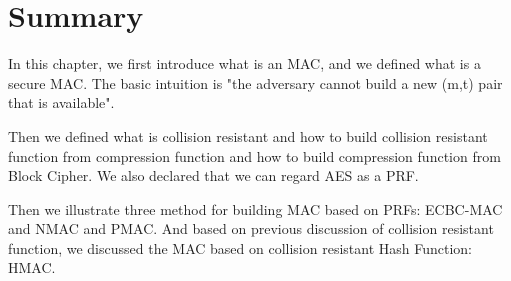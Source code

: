 \section{Summary}
In this chapter, we first introduce what is an MAC, and we defined what is a secure MAC. The basic intuition is "the adversary cannot build a new (m,t) pair that is available".

Then we defined what is collision resistant and how to build collision resistant function from compression function and how to build compression function from Block Cipher. We also declared that we can regard AES as a PRF.

Then we illustrate three method for building MAC based on PRFs:  ECBC-MAC and NMAC and PMAC. And based on previous discussion of collision resistant function, we discussed the MAC based on collision resistant Hash Function: HMAC.
